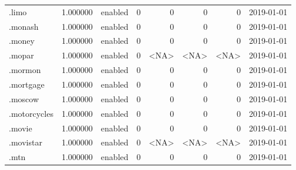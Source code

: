 \begin{tabular}{lrlrrrrl}
.limo                     &          1.000000 &         enabled &                           0 &                           0 &                           0 &                   0 &           2019-01-01 \\
.monash                   &          1.000000 &         enabled &                           0 &                           0 &                           0 &                   0 &           2019-01-01 \\
.money                    &          1.000000 &         enabled &                           0 &                           0 &                           0 &                   0 &           2019-01-01 \\
.mopar                    &          1.000000 &         enabled &                           0 &                        <NA> &                        <NA> &                <NA> &           2019-01-01 \\
.mormon                   &          1.000000 &         enabled &                           0 &                           0 &                           0 &                   0 &           2019-01-01 \\
.mortgage                 &          1.000000 &         enabled &                           0 &                           0 &                           0 &                   0 &           2019-01-01 \\
.moscow                   &          1.000000 &         enabled &                           0 &                           0 &                           0 &                   0 &           2019-01-01 \\
.motorcycles              &          1.000000 &         enabled &                           0 &                           0 &                           0 &                   0 &           2019-01-01 \\
.movie                    &          1.000000 &         enabled &                           0 &                           0 &                           0 &                   0 &           2019-01-01 \\
.movistar                 &          1.000000 &         enabled &                           0 &                        <NA> &                        <NA> &                <NA> &           2019-01-01 \\
.mtn                      &          1.000000 &         enabled &                           0 &                           0 &                           0 &                   0 &           2019-01-01 \\

\end{tabular}
